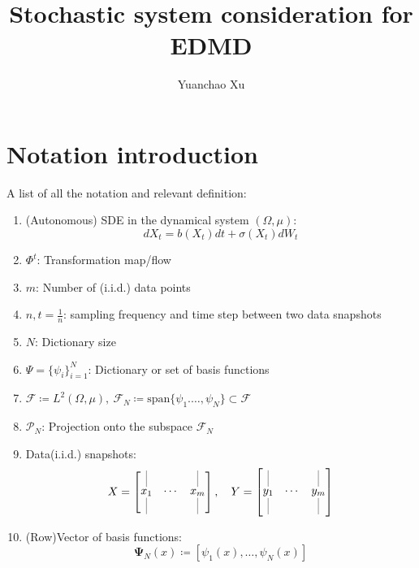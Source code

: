 \documentclass{article}[11]
\title{Stochastic system consideration for EDMD}
\author{Yuanchao Xu}
\begin{document}
\maketitle

\section{Notation introduction}
A list of all the notation and relevant definition:
\begin{enumerate}
	\item (Autonomous) SDE in the dynamical system $(\Omega, \mu)$:
	$$dX_t = b(X_t)dt + \sigma(X_t)dW_t$$
	
	\item $\Phi^{t}$: Transformation map/flow
	
	\item $m$: Number of (i.i.d.) data points
	
	\item $n,t=\frac{1}{n}$: sampling frequency and time step between two data snapshots
	
	\item $N$: Dictionary size
	
	\item $\Psi = \{\psi_i\}_{i=1}^N$: Dictionary or set of basis functions
	
	\item $\mathcal{F}\coloneqq L^2(\Omega, \mu), \ \mathcal{F}_N \coloneqq \text{span}\{\psi_1. \dots, \psi_N\}\subset\mathcal{F}$
	
	\item $\mathcal{P}_{N}$: Projection onto the subspace $\mathcal{F}_N$
	
	\item Data(i.i.d.) snapshots:
	\[
	X = \begin{bmatrix} 
		\underset{\rule{0.1mm}{5mm}}{\overset{\rule{0.1mm}{5mm}}{x_1}} & \cdots & \underset{\rule{0.1mm}{5mm}}{\overset{\rule{0.1mm}{5mm}}{x_m}}
	\end{bmatrix}
	, \quad
	Y = \begin{bmatrix} 
		\underset{\rule{0.1mm}{5mm}}{\overset{\rule{0.1mm}{5mm}}{y_1}} & \cdots & \underset{\rule{0.1mm}{5mm}}{\overset{\rule{0.1mm}{5mm}}{y_m}}
	\end{bmatrix}
	\]	
	
	\item (Row)Vector of basis functions:
	$$
	\mathbf{\Psi}_N(x) \coloneqq \left[\psi_1(x), \dots, \psi_N(x)\right]
	$$
	

\end{enumerate}
\end{document}
